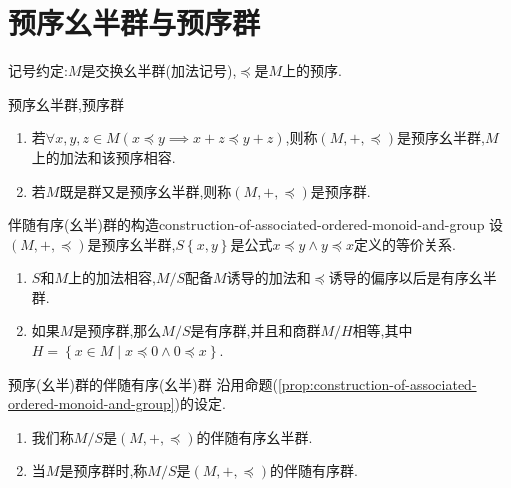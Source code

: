 \section{预序幺半群与预序群}

记号约定:$M$是交换幺半群(加法记号),$\preccurlyeq$是$M$上的预序.

\begin{definition}{预序幺半群,预序群}{}
	\begin{enumerate}
		\item 若$\forall x,y,z\in M\left(x\preccurlyeq y\implies x+z\preccurlyeq y+z\right)$,则称$\left(M,+,\preccurlyeq\right)$是预序幺半群,$M$上的加法和该预序相容.
		\item 若$M$既是群又是预序幺半群,则称$\left(M,+,\preccurlyeq\right)$是预序群.
	\end{enumerate}
\end{definition}

\begin{proposition}{伴随有序(幺半)群的构造}{construction-of-associated-ordered-monoid-and-group}
	设$\left(M,+,\preccurlyeq\right)$是预序幺半群,$S\left\{x,y\right\}$是公式$x\preccurlyeq y\wedge y\preccurlyeq x$定义的等价关系.
	\begin{enumerate}
		\item $S$和$M$上的加法相容,$M/S$配备$M$诱导的加法和$\preccurlyeq$诱导的偏序以后是有序幺半群.
		\item 如果$M$是预序群,那么$M/S$是有序群,并且和商群$M/H$相等,其中$H=\left\{x\in M\middle|x\preccurlyeq 0\wedge 0\preccurlyeq x\right\}$.
	\end{enumerate}
\end{proposition}

\begin{definition}{预序(幺半)群的伴随有序(幺半)群}{}
	沿用命题(\cref{prop:construction-of-associated-ordered-monoid-and-group})的设定.
	\begin{enumerate}
		\item 我们称$M/S$是$\left(M,+,\preccurlyeq\right)$的伴随有序幺半群.
		\item 当$M$是预序群时,称$M/S$是$\left(M,+,\preccurlyeq\right)$的伴随有序群.
	\end{enumerate}
\end{definition}